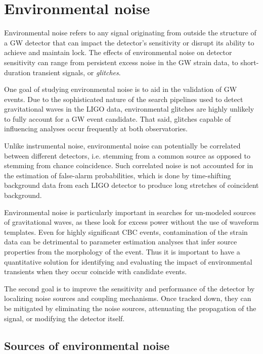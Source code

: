 \section{Environmental noise}

Environmental noise refers to any signal originating from outside the structure of a \ac{GW} detector that can impact the detector's sensitivity or disrupt its ability to achieve and maintain lock.
The effects of environmental noise on detector sensitivity can range from persistent excess noise in the \ac{GW} strain data, to short-duration transient signals, or \textit{glitches}.

One goal of studying environmental noise is to aid in the validation of \ac{GW} events.
Due to the sophisticated nature of the search pipelines used to detect gravitational waves in the \ac{LIGO} data, environmental glitches are highly unlikely to fully account for a \ac{GW} event candidate.
That said, glitches capable of influencing analyses occur frequently at both observatories.

Unlike instrumental noise, environmental noise can potentially be correlated between different detectors, i.e. stemming from a common source as opposed to stemming from chance coincidence.
Such correlated noise is not accounted for in the estimation of false-alarm probabilities, which is done by time-shifting background data from each \ac{LIGO} detector to produce long stretches of coincident background.

Environmental noise is particularly important in searches for un-modeled sources of gravitational waves, as these look for excess power without the use of waveform templates.
Even for highly significant \ac{CBC} events, contamination of the strain data can be detrimental to parameter estimation analyses that infer source properties from the morphology of the event.
Thus it is important to have a quantitative solution for identifying and evaluating the impact of environmental transients when they occur coincide with candidate events.

The second goal is to improve the sensitivity and performance of the detector by localizing noise sources and coupling mechanisms. Once tracked down, they can be mitigated by eliminating the noise sources, attenuating the propagation of the signal, or modifying the detector itself.

\subsection{Sources of environmental noise}

